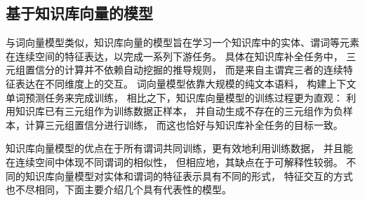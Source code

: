 \subsection{基于知识库向量的模型}

与词向量模型类似，知识库向量的模型旨在学习一个知识库中的实体、谓词等元素
在连续空间的特征表达，以完成一系列下游任务。
具体在知识库补全任务中，
三元组置信分的计算并不依赖自动挖掘的推导规则，
而是来自主谓宾三者的连续特征表达在不同维度上的交互。
词向量模型依靠大规模的纯文本语料，
构建上下文单词预测任务来完成训练\cite{mikolov2013exploiting}，
相比之下，知识库向量模型的训练过程更为直观：
利用知识库已有三元组作为训练数据正样本，
并自动生成不存在的三元组作为负样本，计算三元组置信分进行训练，
而这也恰好与知识库补全任务的目标一致。

知识库向量模型的优点在于所有谓词共同训练，更有效地利用训练数据，
并且能在连续空间中体现不同谓词的相似性，
但相应地，其缺点在于可解释性较弱。
不同的知识库向量模型对实体和谓词的特征表示具有不同的形式，
特征交互的方式也不尽相同，下面主要介绍几个具有代表性的模型。



